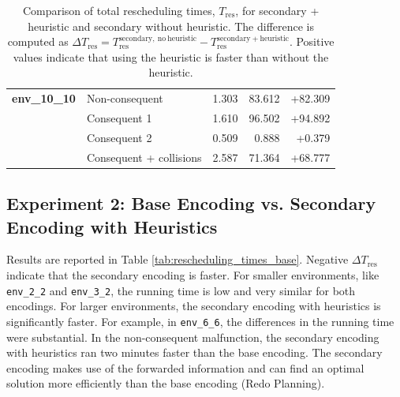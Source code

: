 \documentclass[runningheads]{llncs}
\begin{document}
\begin{table}[hbtp]
\begin{tabular}{@{}llrrr@{}}
		\midrule
		
		\textbf{env\_10\_10}
		& Non-consequent & 1.303 & 83.612 & +82.309 \\
		& Consequent 1 & 1.610 & 96.502 & +94.892 \\
		& Consequent 2 & 0.509 & 0.888 & +0.379 \\
		& Consequent + collisions & 2.587 & 71.364 & +68.777 \\
		
		\bottomrule
	\end{tabular}
	\vspace{4mm}
	\caption{Comparison of total rescheduling times, $T_{\mathrm{res}}$, for secondary + heuristic and secondary without heuristic. The difference is computed as $\Delta T_{\mathrm{res}} = T_{\mathrm{res}}^{\mathrm{secondary,\ no\ heuristic}} - T_{\mathrm{res}}^{\mathrm{secondary+heuristic}}$. Positive values indicate that using the heuristic is faster than without the heuristic.}
	\label{tab:rescheduling_times_heuristic}
\end{table}


\subsection{Experiment 2: Base Encoding vs. Secondary Encoding with Heuristics}
Results are reported in Table \ref{tab:rescheduling_times_base}. Negative $\Delta T_{\mathrm{res}}$ indicate that the secondary encoding is faster. For smaller environments, like \texttt{env\_2\_2} and \texttt{env\_3\_2}, the running time is low and very similar for both encodings.
For larger environments, the secondary encoding with heuristics is significantly faster.
For example, in \texttt{env\_6\_6}, the differences in the running time were substantial.
In the non-consequent malfunction, the secondary encoding with heuristics ran two minutes faster than
the base encoding. 
The secondary encoding makes use of the forwarded information and can find an optimal solution more efficiently than the base encoding (Redo Planning).
\end{document}
